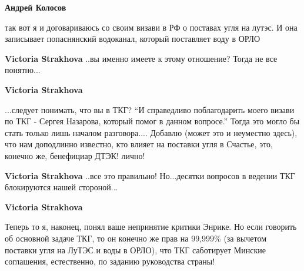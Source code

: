 \begin{itemize}
\begin{itemize}
\textbf{Андрей Колосов} 

так вот я и договариваюсь со своим визави в РФ о поставах угля на лутэс. И она
записывает попаснянский водоканал, который поставляет воду в ОРЛО

\textbf{Victoria Strakhova} ..вы именно имеете к этому отношение? Тогда не все понятно...

\textbf{Victoria Strakhova} 

...следует понимать, что вы в ТКГ? \enquote{И справедливо поблагодарить моего визави по
ТКГ - Сергея Назарова, который помог в данном вопросе.} Тогда это могло бы
стать только лишь началом разговора.... Добавлю (может это и неуместно здесь),
что нам доподлинно известно, кто влияет на поставки угля в Счастье, это,
конечно же, бенефициар ДТЭК! лично!


\textbf{Victoria Strakhova} ..все это правильно! Но...десятки вопросов в ведении ТКГ блокируются нашей стороной...

\textbf{Victoria Strakhova} 

Теперь то я, наконец, понял ваше непринятие критики Энрике. Но если говорить об
основной задаче ТКГ, то он конечно же прав на 99,999\% (за вычетом поставки угля
на ЛуТЭС и воды в ОРЛО), что ТКГ саботирует Минские соглашения, естественно, по
заданию руководства страны!

\end{itemize} %

\end{itemize} %
